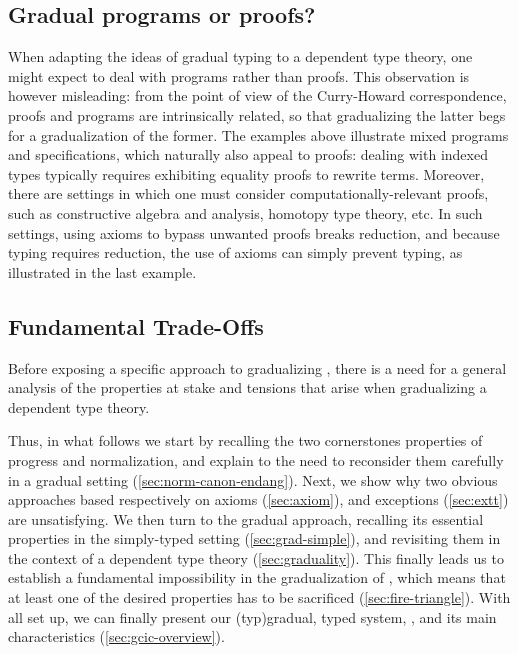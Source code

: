 \subsection{Gradual programs or proofs?}

When adapting the ideas of gradual typing to a dependent type theory, one might
expect to deal with programs rather than proofs.
This observation is however misleading: from the point of view of the Curry-Howard correspondence, proofs and programs are intrinsically related, so that gradualizing the latter begs for a gradualization of the former. The examples above illustrate mixed programs and specifications, which naturally also appeal to proofs: dealing with indexed types typically requires exhibiting equality proofs to rewrite terms.
Moreover, there are settings in which one must consider computationally-relevant proofs, such as constructive algebra and analysis, homotopy type theory, etc. In such settings, using axioms to bypass unwanted proofs breaks reduction, and because typing requires reduction, the use of axioms can simply prevent typing, as illustrated in the last example.

\subsection{Fundamental Trade-Offs}

Before exposing a specific approach to gradualizing ,
there is a need for a general analysis of the properties at stake and tensions
that arise when gradualizing a dependent type theory.

Thus, in what follows
we start by recalling the two cornerstones properties of progress and normalization,
and explain to the need to reconsider them carefully in a gradual setting
(\cref{sec:norm-canon-endang}).
Next, we show why two obvious approaches based respectively on axioms (\cref{sec:axiom}),
and exceptions (\cref{sec:extt}) are unsatisfying.
We then turn to the gradual approach, recalling its essential properties in the simply-typed
setting (\cref{sec:grad-simple}),
and revisiting them in the context of a dependent type theory (\cref{sec:graduality}).
This finally leads us to establish a fundamental impossibility in the gradualization
of , which means that at least one of the desired properties has to be sacrificed (\cref{sec:fire-triangle}).
With all set up, we can finally present our \kl(typ){gradual},
 typed system, , and its main characteristics
(\cref{sec:gcic-overview}).


